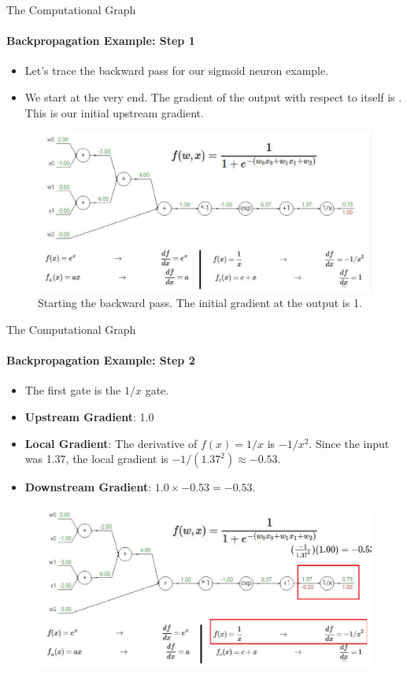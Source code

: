 \begin{frame}{The Computational Graph}
    \framesubtitle{Backpropagation Example: Step 1}
    \begin{itemize}
        \item Let's trace the backward pass for our sigmoid neuron example.
        \item We start at the very end. The gradient of the output with respect to itself is . This is our initial upstream gradient.
    \end{itemize}
    \begin{figure}
        \centering
        \includegraphics[width=\linewidth]{images/sigmoid_backprop_1.png}
        \caption{Starting the backward pass. The initial gradient at the output is 1.}
    \end{figure}
\end{frame}

\begin{frame}{The Computational Graph}
    \framesubtitle{Backpropagation Example: Step 2}
    \begin{itemize}
        \item The first gate is the $1/x$ gate.
        \item \textbf{Upstream Gradient}: 1.0
        \item \textbf{Local Gradient}: The derivative of $f(x) = 1/x$ is $-1/x^2$. Since the input was 1.37, the local gradient is $-1/(1.37^2) \approx -0.53$.
        \item \textbf{Downstream Gradient}: $1.0 \times -0.53 = -0.53$.
    \end{itemize}
    \begin{figure}
        \centering
        \includegraphics[width=\linewidth]{images/sigmoid_backprop_2.png}
    \end{figure}
\end{frame}


